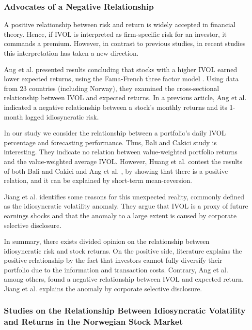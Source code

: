 \subsubsection{Advocates of a Negative Relationship}
A positive relationship between risk and return is widely accepted in financial theory. Hence, if IVOL is interpreted as firm-specific risk for an investor, it commands a premium. However, in contrast to previous studies, in recent studies this interpretation has taken a new direction.

Ang et al. \cite{angetal09} presented results concluding that stocks with a higher IVOL earned lower expected returns, using the Fama-French three factor model \cite{famafrench}. Using data from 23 countries (including Norway), they examined the cross-sectional relationship between IVOL and expected returns. In a previous article, Ang et al. \cite{angetal06} indicated a negative relationship between a stock's monthly returns and its 1-month lagged idiosyncratic risk. 

In our study we consider the relationship between a portfolio's daily IVOL percentage and forecasting performance. Thus, Bali and Cakici \cite{balicakici06} study is interesting. They indicate no relation between value-weighted portfolio returns and the value-weighted average IVOL. However, Huang et al. \cite{huang} contest the results of both Bali and Cakici \cite{balicakici06} and Ang et al. \cite{angetal09}, by showing that there is a positive relation, and it can be explained by short-term mean-reversion.

Jiang et al. \cite{jiangetal} identifies some reasons for this unexpected reality, commonly defined as the idiosyncratic volatility anomaly. They argue that IVOL is a proxy of future earnings shocks and that the anomaly to a large extent is caused by corporate selective disclosure. 

In summary, there exists divided opinion on the relationship between idiosyncratic risk and stock returns. On the positive side, literature explains the positive relationship by the fact that investors cannot fully diversify their portfolio due to the information and transaction costs. Contrary, Ang et al. \cite{angetal06} among others, found a negative relationship between IVOL and expected return. Jiang et al. \cite{jiangetal} explains the anomaly by corporate selective disclosure.

\subsubsection{Studies on the Relationship Between Idiosyncratic Volatility and Returns in the Norwegian Stock Market}

